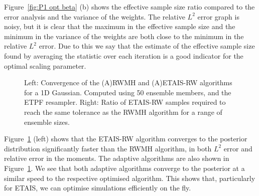 \documentclass[final]{siamltex}
\begin{document}
Figure~\ref{fig:P1 opt beta} (b) shows the effective sample size ratio
compared to the error analysis and the variance of the weights. The
relative $L^2$ error graph is noisy, but it is clear that the maximum
in the effective sample size and the minimum in the variance of the
weights are both close to the minimum in the relative $L^2$ error. Due
to this we say that the estimate of the effective sample size found by
averaging the statistic over each iteration is a good indicator for
the optimal scaling parameter.

\begin{figure}[htb]
\centering 
{}

\caption{Left: Convergence of the (A)RWMH and (A)ETAIS-RW algorithms
  for a 1D Gaussian. Computed using 50 ensemble members, and the
  ETPF resampler. Right: Ratio of ETAIS-RW samples required to reach the same tolerance
  as the RWMH algorithm for a range of ensemble sizes. }
\label{fig:MH1 L2}
\end{figure}


Figure~\ref{fig:MH1 L2} (left) shows that the ETAIS-RW algorithm converges
to the posterior distribution significantly faster than the RWMH
algorithm, in both $L^2$ error and relative error in the moments. The adaptive algorithms are also shown
in Figure~\ref{fig:MH1 L2}. We see that both adaptive algorithms
converge to the posterior at a similar speed to the respective
optimised algorithm. This shows that, particularly for ETAIS, we can
optimise simulations efficiently on the fly.
\end{document}
